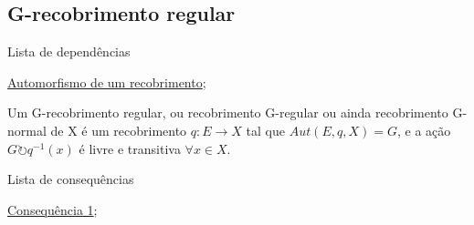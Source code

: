 \subsection{G-recobrimento regular}
\label{g-recobrimento-regular-def}
\begin{titlemize}{Lista de dependências}
	\item \hyperref[automorfismo-de-recobrimento-def]{Automorfismo de um recobrimento};
\end{titlemize}
\begin{defi}
	Um G-recobrimento regular, ou recobrimento G-regular ou ainda recobrimento G-normal de X é um recobrimento $q:E \longrightarrow X$ tal que $Aut(E, q, X) = G$, e a ação $G \circlearrowright q^{-1}(x)$ é livre e transitiva $\forall x \in X$.
\end{defi}

\begin{titlemize}{Lista de consequências}
	\item \hyperref[consequencia1]{Consequência 1};\\ %
	\item \hyperref[]{}
\end{titlemize}

